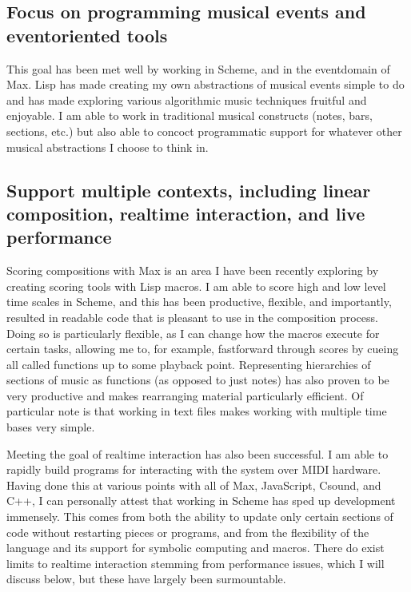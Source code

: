 \documentclass[letterpaper,10pt,english]{sphinxmanual}
\begin{document}
\subsection{Focus on programming musical events and event\sphinxhyphen{}oriented tools}
\label{\detokenize{conclusion:focus-on-programming-musical-events-and-event-oriented-tools}}
\sphinxAtStartPar
This goal has been met well by working in Scheme, and in the event\sphinxhyphen{}domain of Max.
Lisp has made creating my own abstractions of musical events simple to do and has made
exploring various algorithmic music techniques fruitful and enjoyable.
I am able to work in traditional musical constructs (notes, bars, sections, etc.)
but also able to concoct programmatic support for whatever other musical abstractions I choose to think in.


\subsection{Support multiple contexts, including linear composition, real\sphinxhyphen{}time interaction, and live performance}
\label{\detokenize{conclusion:support-multiple-contexts-including-linear-composition-real-time-interaction-and-live-performance}}
\sphinxAtStartPar
Scoring compositions with Max is an area I have been recently exploring by creating
scoring tools with Lisp macros.
I am able to score high and low level time scales in Scheme, and this has been productive,
flexible, and importantly, resulted in readable code that is pleasant to use in the composition process.
Doing so is particularly flexible, as I can change how the macros
execute for certain tasks, allowing me to, for example, fast\sphinxhyphen{}forward through scores by
cueing all called functions up to some playback point.
Representing hierarchies of sections of music as functions (as opposed to just notes)
has also proven to be very productive and makes rearranging material particularly efficient.
Of particular note is that working in text files makes working with multiple time bases very simple.

\sphinxAtStartPar
Meeting the goal of realtime interaction has also been successful.
I am able to rapidly build programs for interacting with the system over MIDI hardware.
Having done this at various points with all of Max, JavaScript, Csound, and C++, I
can personally attest that working in Scheme has sped up development immensely.
This comes from both the ability to update only certain sections of code without restarting
pieces or programs, and from the flexibility of the language and its support for symbolic
computing and macros. There do exist limits to realtime interaction stemming from performance
issues, which I will discuss below, but these have largely been surmountable.
\end{document}
